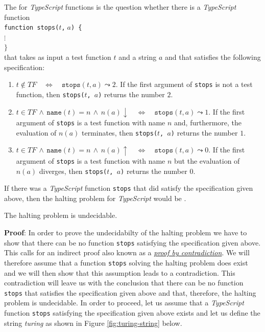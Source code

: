 \noindent
The   for \textsl{TypeScript} functions is the question whether there is a
\textsl{TypeScript} function \\[0.2cm]
\hspace*{1.3cm} \texttt{function stops($t$,$\;a$) \{ } \\
\hspace*{2.3cm} $\vdots$ \\
\hspace*{1.3cm} $\}$
\\[0.2cm] 
that takes as input a test function $t$ and a string $a$ and that satisfies the following specification:
\begin{enumerate}
\item $t \not\in T\!F \quad\Leftrightarrow\quad \mathtt{stops}(t, a) \leadsto 2$.
If the first argument of \texttt{stops} is not a test function, then 
      \texttt{stops($t$, $a$)} returns the number $2$.
\item $t \in T\!F \,\wedge\, \mathtt{name}(t) = n \,\wedge\, n(a)\downarrow \quad\Leftrightarrow\quad
       \mathtt{stops}(t, a) \leadsto 1$.
If the first argument of \texttt{stops} is a test function with name $n$ and, furthermore,
      the evaluation of $n(a)$ terminates, then \texttt{stops($t$, $a$)} returns the number $1$.
\item $t \in T\!F \,\wedge\, \mathtt{name}(t) = n \,\wedge\, n(a)\uparrow \quad\Leftrightarrow\quad
       \mathtt{stops}(t, a) \leadsto 0$.
If the first argument of \texttt{stops} is a test function with name $n$ but the evaluation of $n(a)$ 
      diverges, then 
      \texttt{stops($t$, $a$)} returns the number $0$.
\end{enumerate}
If there was a \textsl{TypeScript} function \texttt{stops} that did satisfy the specification given above,
then the halting problem for \textsl{TypeScript} would be .

\begin{Theorem}
  The halting problem is undecidable.
\end{Theorem}

\noindent
\textbf{Proof}:  In order to prove the undecidabilty of the halting problem we have to show that
there can be no function \texttt{stops} satisfying the specification given above.
This calls for an
indirect proof also known as a \href{http://en.wikipedia.org/wiki/Indirect_proof}{\emph{proof by contradiction}}.
We will therefore assume that a function \texttt{stops} solving the halting problem does
exist and we will then show that this assumption leads to a contradiction.
This contradiction will
leave us with the conclusion that there can be no function \texttt{stops} that satisfies
the specification given above and that, therefore, the halting problem is undecidable.
In order to proceed, let us assume that a \textsl{TypeScript} function \texttt{stops}
satisfying the specification given above exists and let us define the string
\textsl{turing} as shown in Figure \ref{fig:turing-string} below.


